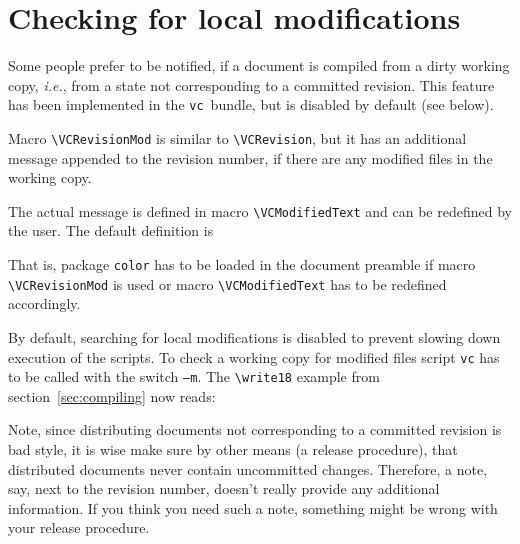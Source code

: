 \documentclass[11pt]{article}
\newlength{\sbslistingwd}
\newcommand*{\pkg}{\texttt{vc}}
\begin{document}
\section{Checking for local modifications}
\label{sec:localmod}
Some people prefer to be notified, if a document is compiled from a
dirty working copy, \emph{i.e.}, from a state not corresponding to a
committed revision.  This feature has been implemented in the \pkg\
bundle, but is disabled by default (see below).

Macro \verb+\VCRevisionMod+ is similar to \verb+\VCRevision+, but it has
an additional message appended to the revision number, if there are any
modified files in the working copy.

The actual message is defined in macro \verb+\VCModifiedText+ and can be
redefined by the user.  The default definition is
\begin{listing}[style=TeX]
\gdef\VCModifiedText{\textcolor{red}{with local modifications!}}
\end{listing}
That is, package \texttt{color} has to be loaded in the document
preamble if macro \verb+\VCRevisionMod+ is used or macro
\verb+\VCModifiedText+ has to be redefined accordingly.

By default, searching for local modifications is disabled to prevent
slowing down execution of the scripts.  To check a working copy for
modified files script \texttt{vc} has to be called with the switch
\texttt{--m}.  The \verb+\write18+ example from
section~\ref{sec:compiling} now reads:\newline
\begin{minipage}{\textwidth}
  \begin{minipage}[t]{\sbslistingwd}
    \begin{listing}[style=TeX, title=Unix\strut]
\immediate{}

    \end{listing}
  \end{minipage}\hfill
  \begin{minipage}[t]{\sbslistingwd}
    \begin{listing}[style=TeX, title=Windows\strut]
\immediate{}

    \end{listing}
  \end{minipage}
\end{minipage}

Note, since distributing documents not corresponding to a committed
revision is bad style, it is wise make sure by other means (a release
procedure), that distributed documents never contain uncommitted
changes.  Therefore, a note, say, next to the revision number, doesn't
really provide any additional information.  If you think you need such a
note, something might be wrong with your release procedure.
\end{document}
